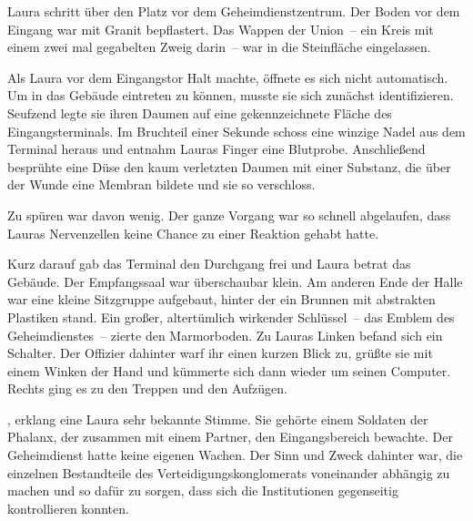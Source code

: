 \par

Laura schritt über den Platz vor dem Geheimdienstzentrum. Der Boden vor dem Eingang war mit Granit bepflastert. Das Wappen der Union~-- ein Kreis mit einem zwei mal gegabelten Zweig darin~-- war in die Steinfläche eingelassen.

\par

Als Laura vor dem Eingangstor Halt machte, öffnete es sich nicht automatisch. Um in das Gebäude eintreten zu können, musste sie sich zunächst identifizieren. Seufzend legte sie ihren Daumen auf eine gekennzeichnete Fläche des Eingangsterminals. Im Bruchteil einer Sekunde schoss eine winzige Nadel aus dem Terminal heraus und entnahm Lauras Finger eine Blutprobe. Anschließend besprühte eine Düse den kaum verletzten Daumen mit einer Substanz, die über der Wunde eine Membran bildete und sie so verschloss.

\par

Zu spüren war davon wenig. Der ganze Vorgang war so schnell abgelaufen, dass Lauras Nervenzellen keine Chance zu einer Reaktion gehabt hatte.

\par

Kurz darauf gab das Terminal den Durchgang frei und Laura betrat das Gebäude. Der Empfangssaal war überschaubar klein. Am anderen Ende der Halle war eine kleine Sitzgruppe aufgebaut, hinter der ein Brunnen mit abstrakten Plastiken stand. Ein großer, altertümlich wirkender Schlüssel~-- das Emblem des Geheimdienstes~-- zierte den Marmorboden. Zu Lauras Linken befand sich ein Schalter. Der Offizier dahinter warf ihr einen kurzen Blick zu, grüßte sie mit einem Winken der Hand und kümmerte sich dann wieder um seinen Computer. Rechts ging es zu den Treppen und den Aufzügen.

\par

, erklang eine Laura sehr bekannte Stimme. Sie gehörte einem Soldaten der Phalanx, der zusammen mit einem Partner, den Eingangsbereich bewachte. Der Geheimdienst hatte keine eigenen Wachen. Der Sinn und Zweck dahinter war, die einzelnen Bestandteile des Verteidigungskonglomerats voneinander abhängig zu machen und so dafür zu sorgen, dass sich die Institutionen gegenseitig kontrollieren konnten.

\par

